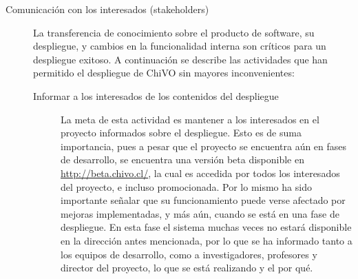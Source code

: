 \begin{description}
	\item [Comunicación con los interesados (stakeholders)] La transferencia de
conocimiento sobre el producto de software, su despliegue, y cambios en la
funcionalidad interna son críticos para un despliegue exitoso. A continuación se
describe las actividades que han permitido el despliegue de ChiVO sin mayores
inconvenientes:
		\begin{description}
			\item [Informar a los interesados de los contenidos del despliegue] La
meta de esta actividad es mantener a los interesados en el proyecto informados
sobre el despliegue. Esto es de suma importancia, pues a pesar que el proyecto
se encuentra aún en fases de desarrollo, se encuentra una versión
beta\footnotemark{} disponible en \url{http://beta.chivo.cl/}, la cual es
accedida por todos los interesados del proyecto, e incluso promocionada. Por lo
mismo ha sido importante señalar que su funcionamiento puede verse afectado por
mejoras implementadas, y más aún, cuando se está en una fase de despliegue. En
esta fase el sistema muchas veces no estará disponible en la dirección antes
mencionada, por lo que se ha informado tanto a los equipos de desarrollo, como a
investigadores, profesores y director del proyecto, lo que se está realizando y
el por qu\'e.


\end{description}
\end{description}
